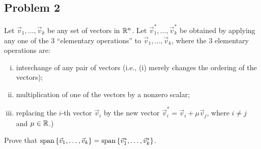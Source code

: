 \documentclass[main.tex]{subfiles}
\begin{document}
\subsection{Problem 2}
\begin{claim}
    Let $\vec{v}_1, \ldots , \vec{v}_k$ be any set of vectors in $\mathbb R^n$. Let $\vec{v}_1^*, \ldots , \vec{v}_k^*$ be obtained by applying any one of the 3 “elementary operations” to $\vec{v}_1, \ldots , \vec{v}_k$, where the 3 elementary operations are:
    \begin{enumerate}[(i)]
        \item interchange of any pair of vectors (i.e., (i) merely changes the ordering of the vectors);
        \item multiplication of one of the vectors by a nonzero scalar;
        \item replacing the $i$-th vector $\vec{v}_i$ by the new vector $\vec{v}_i^* = \vec{v}_i + \mu\vec{v}_j$, where $i \neq j$ and $\mu \in \mathbb R$.)
    \end{enumerate}
    Prove that $\operatorname{span}\left\{ \vec{v}_1, \ldots , \vec{v}_k \right\} = \operatorname{span}\left\{ \vec{v}_1^*, \ldots , \vec{v}_k^* \right\}$.
\end{claim}
\end{document}
